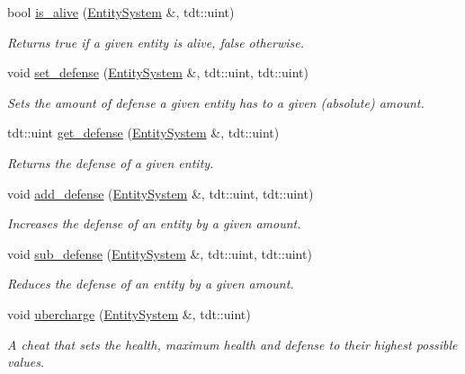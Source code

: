 \begin{DoxyCompactItemize}
bool \hyperlink{namespace_health_helper_a9e085a5c9e15baa26e0c022d7aedeb67}{is\+\_\+alive} (\hyperlink{class_entity_system}{Entity\+System} \&, tdt\+::uint)
\begin{DoxyCompactList}\small\item\em Returns true if a given entity is alive, false otherwise. \end{DoxyCompactList}\item 
void \hyperlink{namespace_health_helper_abf5b115cafefd5a7fd5e9c8e94cd6432}{set\+\_\+defense} (\hyperlink{class_entity_system}{Entity\+System} \&, tdt\+::uint, tdt\+::uint)
\begin{DoxyCompactList}\small\item\em Sets the amount of defense a given entity has to a given (absolute) amount. \end{DoxyCompactList}\item 
tdt\+::uint \hyperlink{namespace_health_helper_a78c219b0a670d90926fc053ee0b60a09}{get\+\_\+defense} (\hyperlink{class_entity_system}{Entity\+System} \&, tdt\+::uint)
\begin{DoxyCompactList}\small\item\em Returns the defense of a given entity. \end{DoxyCompactList}\item 
void \hyperlink{namespace_health_helper_adb42d2a970cb1042a68841aa00239211}{add\+\_\+defense} (\hyperlink{class_entity_system}{Entity\+System} \&, tdt\+::uint, tdt\+::uint)
\begin{DoxyCompactList}\small\item\em Increases the defense of an entity by a given amount. \end{DoxyCompactList}\item 
void \hyperlink{namespace_health_helper_ac75550795f775bfb4b975dc3765444ff}{sub\+\_\+defense} (\hyperlink{class_entity_system}{Entity\+System} \&, tdt\+::uint, tdt\+::uint)
\begin{DoxyCompactList}\small\item\em Reduces the defense of an entity by a given amount. \end{DoxyCompactList}\item 
void \hyperlink{namespace_health_helper_aca891b3c4be912a9574aeba417392c11}{ubercharge} (\hyperlink{class_entity_system}{Entity\+System} \&, tdt\+::uint)
\begin{DoxyCompactList}\small\item\em A cheat that sets the health, maximum health and defense to their highest possible values. \end{DoxyCompactList}\end{DoxyCompactItemize}


